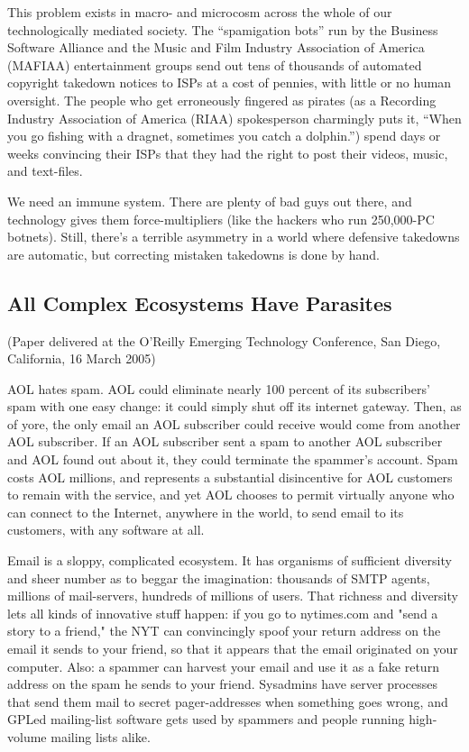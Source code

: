 This problem exists in macro- and microcosm across the whole of our
technologically mediated society. The “spamigation bots” run by the
Business Software Alliance and the Music and Film Industry
Association of America (MAFIAA) entertainment groups send out tens
of thousands of automated copyright takedown notices to ISPs at a
cost of pennies, with little or no human oversight. The people who
get erroneously fingered as pirates (as a Recording Industry
Association of America (RIAA) spokesperson charmingly puts it,
“When you go fishing with a dragnet, sometimes you catch a
dolphin.”) spend days or weeks convincing their ISPs that they had
the right to post their videos, music, and text-files.

We need an immune system. There are plenty of bad guys out there,
and technology gives them force-multipliers (like the hackers who
run 250,000-PC botnets). Still, there’s a terrible asymmetry in a
world where defensive takedowns are automatic, but correcting
mistaken takedowns is done by hand.

\subsection{All Complex Ecosystems Have Parasites}

(Paper delivered at the O'Reilly Emerging Technology Conference,
San Diego, California, 16 March 2005)

AOL hates spam. AOL could eliminate nearly 100 percent of its
subscribers' spam with one easy change: it could simply shut off
its internet gateway. Then, as of yore, the only email an AOL
subscriber could receive would come from another AOL subscriber. If
an AOL subscriber sent a spam to another AOL subscriber and AOL
found out about it, they could terminate the spammer's account.
Spam costs AOL millions, and represents a substantial disincentive
for AOL customers to remain with the service, and yet AOL chooses
to permit virtually anyone who can connect to the Internet,
anywhere in the world, to send email to its customers, with any
software at all.

Email is a sloppy, complicated ecosystem. It has organisms of
sufficient diversity and sheer number as to beggar the imagination:
thousands of SMTP agents, millions of mail-servers, hundreds of
millions of users. That richness and diversity lets all kinds of
innovative stuff happen: if you go to nytimes.com and "send a story
to a friend," the NYT can convincingly spoof your return address on
the email it sends to your friend, so that it appears that the
email originated on your computer. Also: a spammer can harvest your
email and use it as a fake return address on the spam he sends to
your friend. Sysadmins have server processes that send them mail to
secret pager-addresses when something goes wrong, and GPLed
mailing-list software gets used by spammers and people running
high-volume mailing lists alike.

